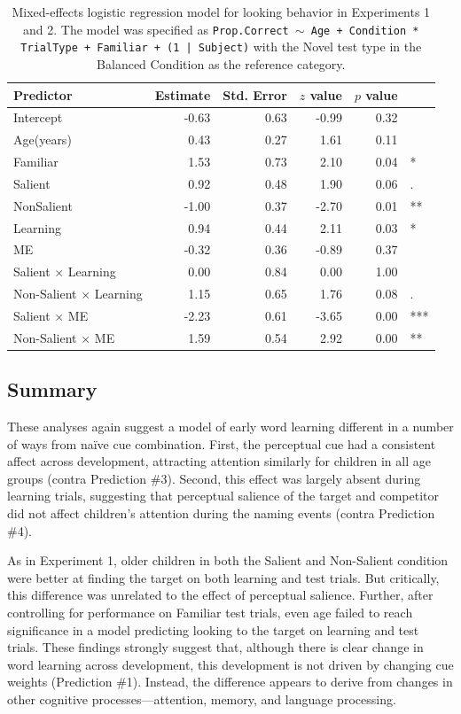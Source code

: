 \documentclass[man,floatsintext]{apa6}
\begin{document}
\begin{table}[t]
\centering
\begin{tabular}{lrrrrl}
 Predictor & Estimate & Std. Error & $z$ value & $p$ value &  \\ 
  \hline
Intercept & -0.63 & 0.63 & -0.99 & 0.32 &  \\ 
  Age(years) & 0.43 & 0.27 & 1.61 & 0.11 &  \\ 
  Familiar & 1.53 & 0.73 & 2.10 & 0.04 & * \\ 
  Salient & 0.92 & 0.48 & 1.90 & 0.06 & . \\ 
  NonSalient & -1.00 & 0.37 & -2.70 & 0.01 & ** \\ 
  Learning & 0.94 & 0.44 & 2.11 & 0.03 & * \\ 
  ME & -0.32 & 0.36 & -0.89 & 0.37 &  \\ 
  Salient $\times$ Learning & 0.00 & 0.84 & 0.00 & 1.00 &  \\ 
  Non-Salient $\times$ Learning & 1.15 & 0.65 & 1.76 & 0.08 & . \\ 
  Salient $\times$ ME & -2.23 & 0.61 & -3.65 & 0.00 & *** \\ 
  Non-Salient $\times$ ME & 1.59 & 0.54 & 2.92 & 0.00 & ** \\ 
   \hline
\end{tabular}
\vspace{6pt}
\caption{\label{tab:model_table} Mixed-effects logistic regression model for looking behavior in Experiments 1 and 2. The model was specified as \small{\tt{Prop.Correct $\sim$ Age + Condition * TrialType + Familiar + (1 | Subject)}} with the Novel test type in the Balanced Condition as the reference category.}
\end{table}

\subsection{Summary}

These analyses again suggest a model of early word learning different in a number of ways from na\"{i}ve cue combination. First, the perceptual cue had a consistent affect across development, attracting attention similarly for children in all age groups (contra Prediction \#3). Second, this effect was largely absent during learning trials, suggesting that perceptual salience of the target and competitor did not affect children's attention during the naming events (contra Prediction \#4). 

As in Experiment 1, older children in both the Salient and Non-Salient condition were better at finding the target on both learning and test trials. But critically, this difference was unrelated to the effect of perceptual salience. Further, after controlling for performance on Familiar test trials, even age failed to reach significance in a model predicting looking to the target on learning and test trials. These findings strongly suggest that, although there is clear change in word learning across development, this development is not driven by changing cue weights (Prediction \#1). Instead, the difference appears to derive from changes in other cognitive processes---attention, memory, and language processing.
\end{document}
